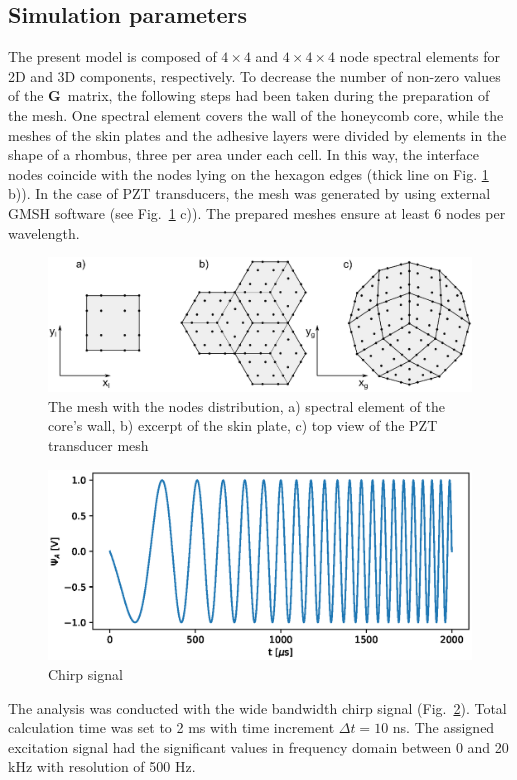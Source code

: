 \documentclass[materials,article,submit,moreauthors,pdftex]{Definitions/mdpi}
\begin{document}
\subsection{Simulation parameters}
\label{sec:simulation}
The present model is composed of \(4 \times 4\) and \(4 \times 4 \times 4\) node spectral elements for 2D and 3D components, respectively.
To decrease the number of non-zero values of the \(\textbf{G}\)~matrix, the following steps had been taken during the preparation of the mesh.
One spectral element covers the wall of the honeycomb core, while the meshes of the skin plates and the adhesive layers were divided by elements in the shape of a rhombus, three per area under each cell.
In this way, the interface nodes coincide with the nodes lying on the hexagon edges (thick line on Fig. \ref{fig:skin_mesh} b)).
In the case of PZT transducers, the mesh was generated by using external GMSH software \cite{geuzaine2009gmsh} (see Fig.~\ref{fig:skin_mesh} c)).
The prepared meshes ensure at least 6 nodes per wavelength.
\begin{figure}
	\begin{center}
		\includegraphics[width=1\linewidth]{../../figures/eps/skin_mesh.eps}
	\end{center}
	\caption{The mesh with the nodes distribution, a) spectral element of the core's wall, b) excerpt of the skin plate, c) top view of the PZT transducer mesh}
	\label{fig:skin_mesh}
\end{figure}
\begin{figure}
	\begin{center}
		\includegraphics[width=1\linewidth]{../../figures/eps/chirp_0_20.eps}
	\end{center}
	\caption{Chirp signal}
	\label{fig:chirp}
\end{figure}
The analysis was conducted with the wide bandwidth chirp signal (Fig.~\ref{fig:chirp}).
Total calculation time was set to 2 ms with time increment \(\Delta t=10\) ns.
The assigned excitation signal had the significant values in frequency domain between 0 and 20 kHz with resolution of 500 Hz.
\end{document}
